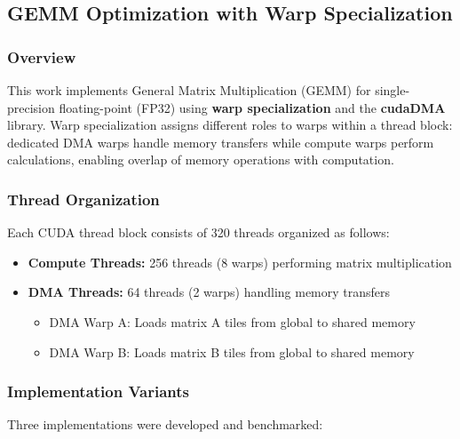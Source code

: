 
\subsection{GEMM Optimization with Warp Specialization}

\subsubsection{Overview}

This work implements General Matrix Multiplication (GEMM) for single-precision floating-point (FP32) using \textbf{warp specialization} and the \textbf{cudaDMA} library. Warp specialization assigns different roles to warps within a thread block: dedicated DMA warps handle memory transfers while compute warps perform calculations, enabling overlap of memory operations with computation.

\subsubsection{Thread Organization}

Each CUDA thread block consists of 320 threads organized as follows:

\begin{itemize}
    \item \textbf{Compute Threads:} 256 threads (8 warps) performing matrix multiplication
    \item \textbf{DMA Threads:} 64 threads (2 warps) handling memory transfers
    \begin{itemize}
        \item DMA Warp A: Loads matrix A tiles from global to shared memory
        \item DMA Warp B: Loads matrix B tiles from global to shared memory
    \end{itemize}
\end{itemize}

\subsubsection{Implementation Variants}

Three implementations were developed and benchmarked:

